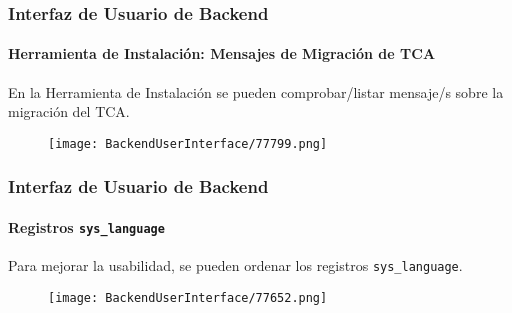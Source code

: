 
\begin{frame}[fragile]
	\frametitle{Interfaz de Usuario de Backend}
	\framesubtitle{Herramienta de Instalación: Mensajes de Migración de TCA}

	En la Herramienta de Instalación se pueden comprobar/listar mensaje/s sobre la migración del TCA.

	\begin{figure}
		\texttt{[image: BackendUserInterface/77799.png]}
	\end{figure}

\end{frame}


\begin{frame}[fragile]
	\frametitle{Interfaz de Usuario de Backend}
	\framesubtitle{Registros \texttt{sys\_language}}

	Para mejorar la usabilidad, se pueden ordenar los registros \texttt{sys\_language}.

	\begin{figure}
		\texttt{[image: BackendUserInterface/77652.png]}
	\end{figure}

\end{frame}


